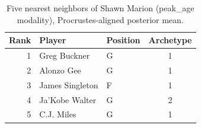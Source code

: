 \begin{table}[htbp]
  \centering\small
  \begin{tabular}{rllc}
    \toprule
    Rank & Player & Position & Archetype \\
    \midrule
    1 & Greg Buckner & G & 1 \\
    2 & Alonzo Gee & G & 1 \\
    3 & James Singleton & F & 1 \\
    4 & Ja'Kobe Walter & G & 2 \\
    5 & C.J. Miles & G & 1 \\
    \bottomrule
  \end{tabular}
  \caption{Five nearest neighbors of Shawn Marion (peak_age modality), Procrustes-aligned posterior mean.}
  \label{tab:Shawn_Marion_neighbors_peak_age}
\end{table}


